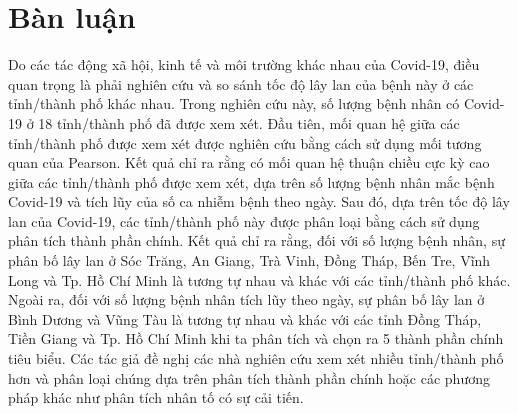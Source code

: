 \documentclass[../thesis.tex]{subfiles}
\begin{document}
\section{Bàn luận}
Do các tác động xã hội, kinh tế và môi trường khác nhau của Covid-19, điều quan trọng là phải nghiên cứu và so sánh tốc độ lây lan của bệnh này ở các tỉnh/thành phố khác nhau. Trong nghiên cứu này, số lượng bệnh nhân có Covid-19 ở 18 tỉnh/thành phố đã được xem xét. Đầu tiên, mối quan hệ giữa các tỉnh/thành phố được xem xét được nghiên cứu bằng cách sử dụng mối tương quan của Pearson. Kết quả chỉ ra rằng có mối quan hệ thuận chiều cực kỳ cao giữa các tỉnh/thành phố được xem xét, dựa trên số lượng bệnh nhân mắc bệnh Covid-19 và tích lũy của số ca nhiễm bệnh theo ngày. Sau đó, dựa trên tốc độ lây lan của Covid-19, các tỉnh/thành phố này được phân loại bằng cách sử dụng phân tích thành phần chính. Kết quả chỉ ra rằng, đối với số lượng bệnh nhân, sự phân bố lây lan ở Sóc Trăng, An Giang, Trà Vinh, Đồng Tháp, Bến Tre, Vĩnh Long và Tp. Hồ Chí Minh là tương tự nhau và khác với các tỉnh/thành phố khác. Ngoài ra, đối với số lượng bệnh nhân tích lũy theo ngày, sự phân bố lây lan ở Bình Dương và Vũng Tàu là tương tự nhau và khác với các tỉnh Đồng Tháp, Tiền Giang và Tp. Hồ Chí Minh khi ta phân tích và chọn ra 5 thành phần chính tiêu biểu. Các tác giả đề nghị các nhà nghiên cứu xem xét nhiều tỉnh/thành phố hơn và phân loại chúng dựa trên phân tích thành phần chính hoặc các phương pháp khác như phân tích nhân tố có sự cải tiến.
\end{document}
